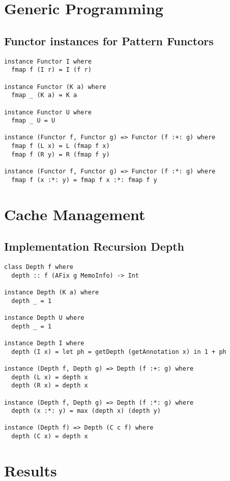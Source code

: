 \appendix
\chapter{Generic Programming}
\section{Functor instances for Pattern Functors}
\label{app-inst-functor-patfun}
\begin{verbatim}
instance Functor I where
  fmap f (I r) = I (f r)

instance Functor (K a) where
  fmap _ (K a) = K a

instance Functor U where
  fmap _ U = U

instance (Functor f, Functor g) => Functor (f :+: g) where
  fmap f (L x) = L (fmap f x)
  fmap f (R y) = R (fmap f y)

instance (Functor f, Functor g) => Functor (f :*: g) where
  fmap f (x :*: y) = fmap f x :*: fmap f y
\end{verbatim}

\chapter{Cache Management}
\section{Implementation Recursion Depth}
\label{app-sec-impl-rec-depth}
\begin{verbatim}
class Depth f where
  depth :: f (AFix g MemoInfo) -> Int

instance Depth (K a) where
  depth _ = 1

instance Depth U where
  depth _ = 1

instance Depth I where
  depth (I x) = let ph = getDepth (getAnnotation x) in 1 + ph

instance (Depth f, Depth g) => Depth (f :+: g) where
  depth (L x) = depth x
  depth (R x) = depth x

instance (Depth f, Depth g) => Depth (f :*: g) where
  depth (x :*: y) = max (depth x) (depth y)

instance (Depth f) => Depth (C c f) where
  depth (C x) = depth x
\end{verbatim}

\chapter{Results}

